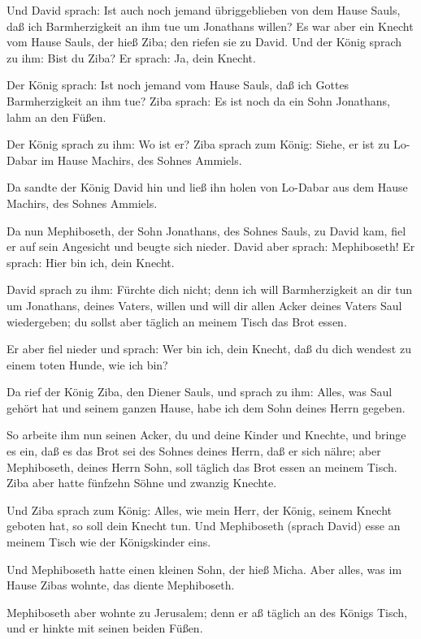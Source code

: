  Und David sprach: Ist auch noch jemand übriggeblieben von
dem Hause Sauls, daß ich Barmherzigkeit an ihm tue um Jonathans willen?
 Es war aber ein Knecht vom Hause Sauls, der hieß Ziba; den
riefen sie zu David. Und der König sprach zu ihm: Bist du Ziba? Er
sprach: Ja, dein Knecht.

 Der König sprach: Ist noch jemand vom Hause Sauls, daß ich
Gottes Barmherzigkeit an ihm tue? Ziba sprach: Es ist noch da ein Sohn
Jonathans, lahm an den Füßen.

 Der König sprach zu ihm: Wo ist er? Ziba sprach zum König:
Siehe, er ist zu Lo-Dabar im Hause Machirs, des Sohnes Ammiels.

 Da sandte der König David hin und ließ ihn holen von
Lo-Dabar aus dem Hause Machirs, des Sohnes Ammiels.

 Da nun Mephiboseth, der Sohn Jonathans, des Sohnes Sauls,
zu David kam, fiel er auf sein Angesicht und beugte sich nieder. David
aber sprach: Mephiboseth! Er sprach: Hier bin ich, dein Knecht.

 David sprach zu ihm: Fürchte dich nicht; denn ich will
Barmherzigkeit an dir tun um Jonathans, deines Vaters, willen und will
dir allen Acker deines Vaters Saul wiedergeben; du sollst aber täglich
an meinem Tisch das Brot essen.

 Er aber fiel nieder und sprach: Wer bin ich, dein Knecht,
daß du dich wendest zu einem toten Hunde, wie ich bin?

 Da rief der König Ziba, den Diener Sauls, und sprach zu
ihm: Alles, was Saul gehört hat und seinem ganzen Hause, habe ich dem
Sohn deines Herrn gegeben.

 So arbeite ihm nun seinen Acker, du und deine Kinder und
Knechte, und bringe es ein, daß es das Brot sei des Sohnes deines Herrn,
daß er sich nähre; aber Mephiboseth, deines Herrn Sohn, soll täglich das
Brot essen an meinem Tisch. Ziba aber hatte fünfzehn Söhne und zwanzig
Knechte.

 Und Ziba sprach zum König: Alles, wie mein Herr, der
König, seinem Knecht geboten hat, so soll dein Knecht tun. Und
Mephiboseth (sprach David) esse an meinem Tisch wie der Königskinder
eins.

 Und Mephiboseth hatte einen kleinen Sohn, der hieß Micha.
Aber alles, was im Hause Zibas wohnte, das diente Mephiboseth.

 Mephiboseth aber wohnte zu Jerusalem; denn er aß täglich
an des Königs Tisch, und er hinkte mit seinen beiden Füßen.

